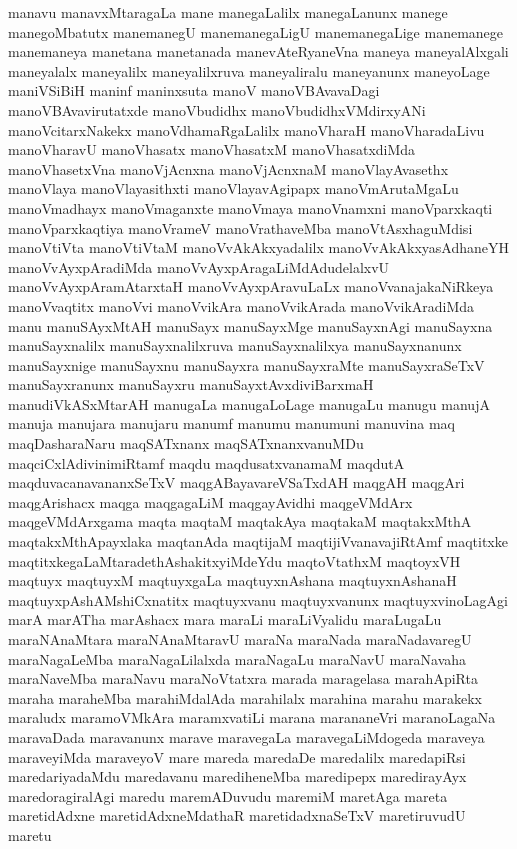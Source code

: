{manavu
manavxMtaragaLa
mane
manegaLalilx
manegaLanunx
manege
manegoMbatutx
manemanegU
manemanegaLigU
manemanegaLige
manemanege
manemaneya
manetana
manetanada
manevAteRyaneVna
maneya
maneyalAlxgali
maneyalalx
maneyalilx
maneyalilxruva
maneyaliralu
maneyanunx
maneyoLage
maniVSiBiH
maninf
maninxsuta
manoV
manoVBAvavaDagi
manoVBAvavirutatxde
manoVbudidhx
manoVbudidhxVMdirxyANi
manoVcitarxNakekx
manoVdhamaRgaLalilx
manoVharaH
manoVharadaLivu
manoVharavU
manoVhasatx
manoVhasatxM
manoVhasatxdiMda
manoVhasetxVna
manoVjAcnxna
manoVjAcnxnaM
manoVlayAvasethx
manoVlaya
manoVlayasithxti
manoVlayavAgipapx
manoVmArutaMgaLu
manoVmadhayx
manoVmaganxte
manoVmaya
manoVnamxni
manoVparxkaqti
manoVparxkaqtiya
manoVrameV
manoVrathaveMba
manoVtAsxhaguMdisi
manoVtiVta
manoVtiVtaM
manoVvAkAkxyadalilx
manoVvAkAkxyasAdhaneYH
manoVvAyxpAradiMda
manoVvAyxpAragaLiMdAdudelalxvU
manoVvAyxpAramAtarxtaH
manoVvAyxpAravuLaLx
manoVvanajakaNiRkeya
manoVvaqtitx
manoVvi
manoVvikAra
manoVvikArada
manoVvikAradiMda
manu
manuSAyxMtAH
manuSayx
manuSayxMge
manuSayxnAgi
manuSayxna
manuSayxnalilx
manuSayxnalilxruva
manuSayxnalilxya
manuSayxnanunx
manuSayxnige
manuSayxnu
manuSayxra
manuSayxraMte
manuSayxraSeTxV
manuSayxranunx
manuSayxru
manuSayxtAvxdiviBarxmaH
manudiVkASxMtarAH
manugaLa
manugaLoLage
manugaLu
manugu
manujA
manuja
manujara
manujaru
manumf
manumu
manumuni
manuvina
maq
maqDasharaNaru
maqSATxnanx
maqSATxnanxvanuMDu
maqciCxlAdivinimiRtamf
maqdu
maqdusatxvanamaM
maqdutA
maqduvacanavananxSeTxV
maqgABayavareVSaTxdAH
maqgAH
maqgAri
maqgArishacx
maqga
maqgagaLiM
maqgayAvidhi
maqgeVMdArx
maqgeVMdArxgama
maqta
maqtaM
maqtakAya
maqtakaM
maqtakxMthA
maqtakxMthApayxlaka
maqtanAda
maqtijaM
maqtijiVvanavajiRtAmf
maqtitxke
maqtitxkegaLaMtaradethAshakitxyiMdeYdu
maqtoVtathxM
maqtoyxVH
maqtuyx
maqtuyxM
maqtuyxgaLa
maqtuyxnAshana
maqtuyxnAshanaH
maqtuyxpAshAMshiCxnatitx
maqtuyxvanu
maqtuyxvanunx
maqtuyxvinoLagAgi
marA
marATha
marAshacx
mara
maraLi
maraLiVyalidu
maraLugaLu
maraNAnaMtara
maraNAnaMtaravU
maraNa
maraNada
maraNadavaregU
maraNagaLeMba
maraNagaLilalxda
maraNagaLu
maraNavU
maraNavaha
maraNaveMba
maraNavu
maraNoVtatxra
marada
maragelasa
marahApiRta
maraha
maraheMba
marahiMdalAda
marahilalx
marahina
marahu
marakekx
maraludx
maramoVMkAra
maramxvatiLi
marana
marananeVri
maranoLagaNa
maravaDada
maravanunx
marave
maravegaLa
maravegaLiMdogeda
maraveya
maraveyiMda
maraveyoV
mare
mareda
maredaDe
maredalilx
maredapiRsi
maredariyadaMdu
maredavanu
marediheneMba
maredipepx
maredirayAyx
maredoragiralAgi
maredu
maremADuvudu
maremiM
maretAga
mareta
maretidAdxne
maretidAdxneMdathaR
maretidadxnaSeTxV
maretiruvudU
maretu
}

